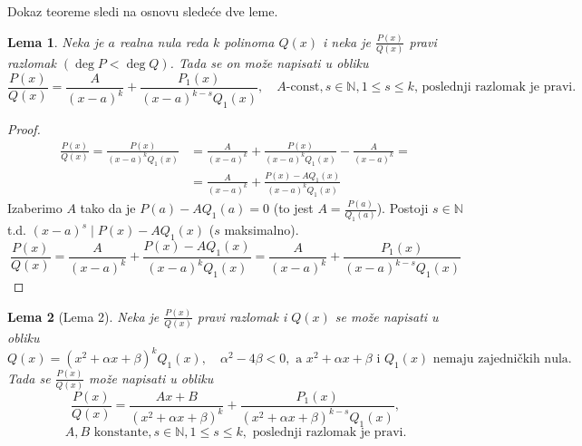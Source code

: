 \documentclass[a4paper,12pt,twoside]{report}
\newtheorem{lemma}{Lema}[section]
\numberwithin{algorithm}{section}
\begin{document}
Dokaz teoreme sledi na osnovu sledeće dve leme.

\begin{lemma}
    Neka je \(a\) realna nula reda \(k\) polinoma \(Q(x)\) i neka je \(\frac{P(x)}{Q(x)}\) pravi razlomak $(\deg P < \deg Q)$. Tada se on može napisati u obliku
    \[
        \frac{P(x)}{Q(x)} = \frac{A}{(x-a)^k} + \frac{P_1(x)}{(x-a)^{k-s}Q_1(x)}, \quad A\text{-const}, s \in \mathbb{N}, 1 \leq s \leq k \text{, poslednji razlomak je pravi.}
    \]
\end{lemma}

\begin{proof}
    \begin{align*}
        \frac{P(x)}{Q(x)} = \frac{P(x)}{(x-a)^k Q_1(x)} &= \frac{A}{(x-a)^k} + \frac{P(x)}{(x-a)^k Q_1(x)} - \frac{A}{(x-a)^k} = \\
        &= \frac{A}{(x-a)^k} + \frac{P(x) - A Q_1(x)}{(x-a)^k Q_1(x)}
    \end{align*}
    Izaberimo \(A\) tako da je \(P(a) - A Q_1(a) = 0\) (to jest \(A = \frac{P(a)}{Q_1(a)}\)). Postoji \(s \in \mathbb{N}\) t.d. \((x-a)^s \mid P(x) - A Q_1(x)\) (\(s\) maksimalno).
    \[
        \frac{P(x)}{Q(x)} = \frac{A}{(x-a)^k} + \frac{P(x) - A Q_1(x)}{(x-a)^k Q_1(x)} = \frac{A}{(x-a)^k} + \frac{P_1(x)}{(x-a)^{k-s} Q_1(x)}
    \]
\end{proof}

\begin{lemma}[Lema 2]
    Neka je \(\frac{P(x)}{Q(x)}\) pravi razlomak i \(Q(x)\) se može napisati u obliku 
    \[
        Q(x) = (x^2+\alpha x+\beta)^k Q_1(x), \quad \alpha^2 - 4\beta < 0, \text{ a } x^2+\alpha x+\beta \text{ i } Q_1(x) \text{ nemaju zajedničkih nula.}
    \]
    Tada se \(\frac{P(x)}{Q(x)}\) može napisati u obliku
    \[
        \frac{P(x)}{Q(x)} = \frac{Ax+B}{(x^2+\alpha x+\beta)^k} + \frac{P_1(x)}{(x^2+\alpha x+\beta)^{k-s} Q_1(x)}, 
    \]
    \[A, B \text{ konstante}, s \in \mathbb{N}, 1 \leq s \leq k, \text{ poslednji razlomak je pravi.}\]
\end{lemma}
\end{document}
